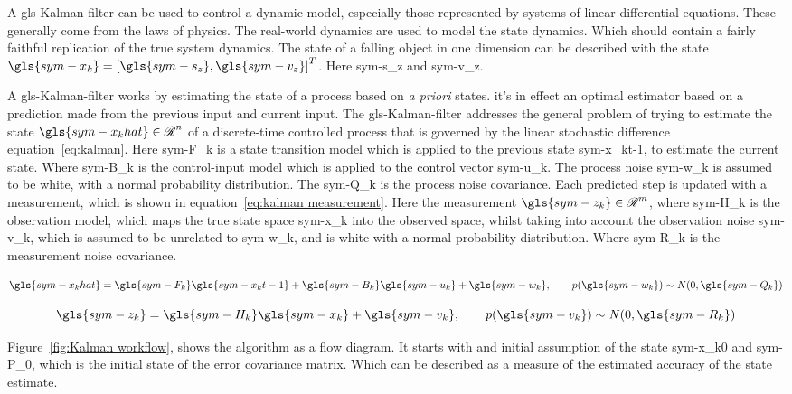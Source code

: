A \gls{gls-Kalman-filter} can be used to control a dynamic model, especially those represented by systems of linear
differential equations. These generally come from the laws of physics. The real-world dynamics are used to model the
state dynamics. Which should contain a fairly faithful replication of the true system dynamics. The state of a falling
object in one dimension can be described with the state \( \gls{sym-x_k} = \left[\gls{sym-s_z}, \gls{sym-v_z}\right]^T
\). Here \gls{sym-s_z} and \gls{sym-v_z}.

A \gls{gls-Kalman-filter} works by estimating the state of a process based on \textit{a priori} states. it's in effect
an optimal estimator based on a prediction made from the previous input and current input. The \gls{gls-Kalman-filter}
addresses the general problem of trying to estimate the state \( \gls{sym-x_khat} \in \Re^n \) of a discrete-time
controlled process that is governed by the linear stochastic difference equation~\ref{eq:kalman}. Here \gls{sym-F_k} is
a state transition model which is applied to the previous state \gls{sym-x_kt-1}, to estimate the current state. Where
\gls{sym-B_k} is the control-input model which is applied to the control vector \gls{sym-u_k}. The process noise
\gls{sym-w_k} is assumed to be white, with a normal probability distribution. The \gls{sym-Q_k} is the process noise
covariance. Each predicted step is updated with a measurement, which is shown in equation~\ref{eq:kalman measurement}.
Here the measurement \( \gls{sym-z_k} \in \Re^m  \), where \gls{sym-H_k} is the observation model, which maps the true
state space \gls{sym-x_k} into the observed space, whilst taking into account the observation noise \gls{sym-v_k}, which
is assumed to be unrelated to \gls{sym-w_k}, and is white with a normal probability distribution. Where \gls{sym-R_k} is
the measurement noise covariance.

\begin{equation}
    \label{eq:kalman}
    \gls{sym-x_khat} = \gls{sym-F_k} \gls{sym-x_kt-1} + \gls{sym-B_k} \gls{sym-u_k} + \gls{sym-w_k}, \qquad p
	(\gls{sym-w_k}) \sim \mathit{N}(0,\gls{sym-Q_k})
\end{equation}

\begin{equation}
    \label{eq:kalman measurement}
    \gls{sym-z_k} = \gls{sym-H_k} \gls{sym-x_k} + \gls{sym-v_k}, \qquad p(\gls{sym-v_k}) \sim \mathit{N}(0,
	\gls{sym-R_k})
\end{equation}

Figure~\ref{fig:Kalman workflow}, shows the algorithm as a flow diagram. It starts with and initial assumption of the
state \gls{sym-x_k0} and \gls{sym-P_0}, which is the initial state of the error covariance matrix. Which can be
described as a measure of the estimated accuracy of the state estimate.

